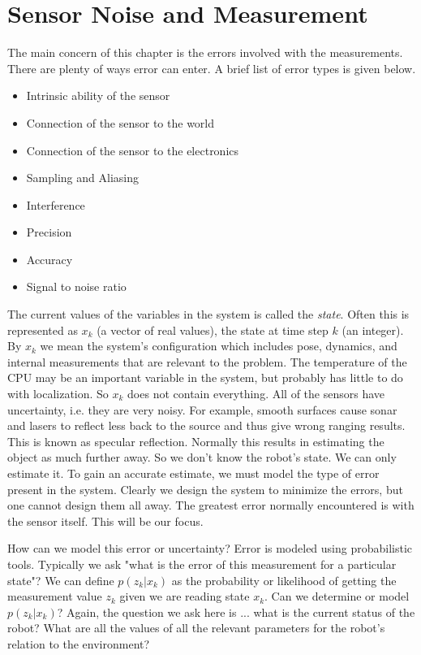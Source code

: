 \hypertarget{sensor-noise-and-measurement}{%
\section{Sensor Noise and
Measurement}\label{sensor-noise-and-measurement}}

The main concern of this chapter is the errors involved with the
measurements. There are plenty of ways error can enter. A brief list of
error types is given below.

\begin{itemize}
\tightlist
\item
  Intrinsic ability of the sensor
\item
  Connection of the sensor to the world
\item
  Connection of the sensor to the electronics
\item
  Sampling and Aliasing
\item
  Interference
\item
  Precision
\item
  Accuracy
\item
  Signal to noise ratio
\end{itemize}

The current values of the variables in the system is called the
\emph{state}. Often this is represented as \(x_k\) (a vector of real
values), the state at time step \(k\) (an integer). By \(x_k\) we mean
the system's configuration which includes pose, dynamics, and internal
measurements that are relevant to the problem. The temperature of the
CPU may be an important variable in the system, but probably has little
to do with localization. So \(x_k\) does not contain everything. All of
the sensors have uncertainty, i.e. they are very noisy. For example,
smooth surfaces cause sonar and lasers to reflect less back to the
source and thus give wrong ranging results. This is known as specular
reflection. Normally this results in estimating the object as much
further away. So we don't know the robot's state. We can only estimate
it. To gain an accurate estimate, we must model the type of error
present in the system. Clearly we design the system to minimize the
errors, but one cannot design them all away. The greatest error normally
encountered is with the sensor itself. This will be our focus.

How can we model this error or uncertainty? Error is modeled using
probabilistic tools. Typically we ask "what is the error of this
measurement for a particular state"? We can define \(p(z_k|x_k)\) as the
probability or likelihood of getting the measurement value \(z_k\) given
we are reading state \(x_k\). Can we determine or model \(p(z_k|x_k)\)?
Again, the question we ask here is ... what is the current status of the
robot? What are all the values of all the relevant parameters for the
robot's relation to the environment?

